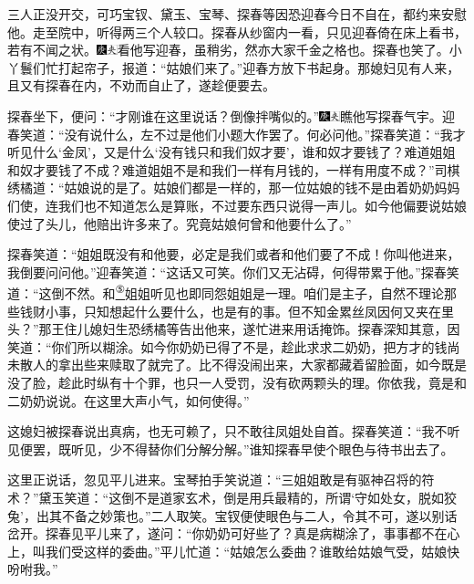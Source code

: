 三人正没开交，可巧宝钗、黛玉、宝琴、探春等因恐迎春今日不自在，都约来安慰他。走至院中，听得两三个人较口。探春从纱窗内一看，只见迎春倚在床上看书，若有不闻之状。{\includegraphics[width=3mm]{../Images/00004}\includegraphics[width=3mm]{../Images/00012}\footnotesize \kaishu 看他写迎春，虽稍劣，然亦大家千金之格也。}探春也笑了。小丫鬟们忙打起帘子，报道：``姑娘们来了。''迎春方放下书起身。那媳妇见有人来，且又有探春在内，不劝而自止了，遂趁便要去。

探春坐下，便问：``才刚谁在这里说话？倒像拌嘴似的。''{\includegraphics[width=3mm]{../Images/00004}\includegraphics[width=3mm]{../Images/00012}\footnotesize \kaishu 瞧他写探春气宇。}迎春笑道：``没有说什么，左不过是他们小题大作罢了。何必问他。''探春笑道：``我才听见什么`金凤'，又是什么`没有钱只和我们奴才要'，谁和奴才要钱了？难道姐姐和奴才要钱了不成？难道姐姐不是和我们一样有月钱的，一样有用度不成？''司棋绣橘道：``姑娘说的是了。姑娘们都是一样的，那一位姑娘的钱不是由着奶奶妈妈们使，连我们也不知道怎么是算账，不过要东西只说得一声儿。如今他偏要说姑娘使过了头儿，他赔出许多来了。究竟姑娘何曾和他要什么了。''

探春笑道：``姐姐既没有和他要，必定是我们或者和他们要了不成！你叫他进来，我倒要问问他。''迎春笑道：``这话又可笑。你们又无沾碍，何得带累于他。''探春笑道：``这倒不然。和\href{../Text/part0077_split_000.html\#lnkback_5_a}{\textsuperscript{⑤}}姐姐听见也即同怨姐姐是一理。咱们是主子，自然不理论那些钱财小事，只知想起什么要什么，也是有的事。但不知金累丝凤因何又夹在里头？''那王住儿媳妇生恐绣橘等告出他来，遂忙进来用话掩饰。探春深知其意，因笑道：``你们所以糊涂。如今你奶奶已得了不是，趁此求求二奶奶，把方才的钱尚未散人的拿出些来赎取了就完了。比不得没闹出来，大家都藏着留脸面，如今既是没了脸，趁此时纵有十个罪，也只一人受罚，没有砍两颗头的理。你依我，竟是和二奶奶说说。在这里大声小气，如何使得。''

这媳妇被探春说出真病，也无可赖了，只不敢往凤姐处自首。探春笑道：``我不听见便罢，既听见，少不得替你们分解分解。''谁知探春早使个眼色与待书出去了。

这里正说话，忽见平儿进来。宝琴拍手笑说道：``三姐姐敢是有驱神召将的符术？''黛玉笑道：``这倒不是道家玄术，倒是用兵最精的，所谓`守如处女，脱如狡兔'，出其不备之妙策也。''二人取笑。宝钗便使眼色与二人，令其不可，遂以别话岔开。探春见平儿来了，遂问：``你奶奶可好些了？真是病糊涂了，事事都不在心上，叫我们受这样的委曲。''平儿忙道：``姑娘怎么委曲？谁敢给姑娘气受，姑娘快吩咐我。''

